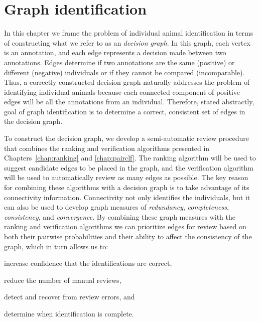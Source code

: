 \chapter{Graph identification}\label{chap:graphid}
\newcommand{\nT}{N}

In this chapter we frame the problem of individual animal identification in terms of constructing what we refer to as an
\emph{decision graph}. In this graph, each vertex is an annotation, and each edge represents a decision made between
two annotations.  Edges determine if two annotations are the same (positive) or different (negative) individuals or if
they cannot be compared (incomparable). Thus, a correctly constructed decision graph naturally addresses the problem of
identifying individual animals because each connected component of positive edges will be all the annotations from an
individual. Therefore, stated abstractly, goal of graph identification is to determine a correct, consistent set of
edges in the decision graph.

To construct the decision graph, we develop a semi-automatic review procedure that combines the ranking and verification
algorithms presented in Chapters~\ref{chap:ranking} and \ref{chap:pairclf}. The ranking algorithm will be used to
suggest candidate edges to be placed in the graph, and the verification algorithm will be used to automatically review
as many edges as possible.  The key reason for combining these algorithms with a decision graph is to take advantage of
its connectivity information.  Connectivity not only identifies the individuals, but it can also be used to develop
graph measures of \emph{redundancy}, \emph{completeness}, \emph{consistency}, and \emph{convergence}.  By combining
these graph measures with the ranking and verification algorithms we can prioritize edges for review based on both their
pairwise probabilities and their ability to affect the consistency of the graph, which in turn allows us to:
\begin{enumin}
\item increase confidence that the identifications are correct, %
\item reduce the number of manual reviews,  %
\item detect and recover from review errors, and %
\item determine when identification is complete. %
\end{enumin}

